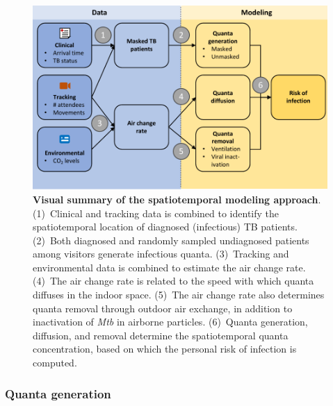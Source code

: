 \documentclass[fleqn,11pt]{wlscirep}
\begin{document}
\begin{figure}[!htpb]
    \centering
    \includegraphics{doc/paper/flow-chart.pdf}
    \caption{\textbf{Visual summary of the spatiotemporal modeling approach}. (1)~Clinical and tracking data is combined to identify the spatiotemporal location of diagnosed (infectious) TB patients. (2)~Both diagnosed and randomly sampled undiagnosed  patients among visitors generate infectious quanta. (3)~Tracking and environmental data is combined to estimate the air change rate. (4)~The air change rate is related to the speed with which quanta diffuses in the indoor space. (5)~The air change rate also determines quanta removal through outdoor air exchange, in addition to inactivation of \emph{Mtb} in airborne particles. (6)~Quanta generation, diffusion, and removal determine the spatiotemporal quanta concentration, based on which the personal risk of infection is computed.}
    \label{fig:modeling-flow}
\end{figure}

\subsubsection*{Quanta generation}
\end{document}
